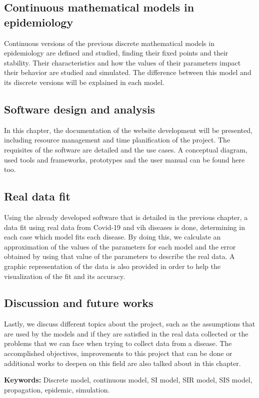 \subsection*{Continuous mathematical models in epidemiology}

Continuous versions of the previous discrete mathematical models in epidemiology are defined and studied, finding their fixed points and their stability. Their characteristics and how the values of their parameters impact their behavior are studied and simulated. The difference between this model and its discrete versions will be explained in each model.

\subsection*{Software design and analysis}

In this chapter, the documentation of the website development will be presented, including resource management and time planification of the project. The requisites of the software are detailed and the use cases. A conceptual diagram, used tools and frameworks, prototypes and the user manual can be found here too.

\subsection*{Real data fit}

Using the already developed software that is detailed in the previous chapter, a data fit using real data from Covid-19 and vih diseases is done, determining in each case which model fits each disease. By doing this, we calculate an approximation of the values of the parameters for each model and the error obtained by using that value of the parameters to describe the real data. A graphic representation of the data is also provided in order to help the visualization of the fit and its accuracy.

\subsection*{Discussion and future works}

Lastly, we discuss different topics about the project, such as the assumptions that are used by the models and if they are satisfied in the real data collected or the problems that we can face when trying to collect data from a disease. The accomplished objectives, improvements to this project that can be done or additional works to deepen on this field are also talked about in this chapter.

\textbf{Keywords: } Discrete model, continuous model, SI model, SIR model, SIS model, propagation, epidemic, simulation.
